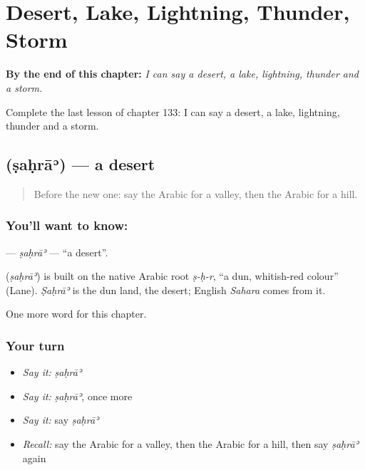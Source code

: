 
\chapter{Desert, Lake, Lightning, Thunder, Storm}
\label{ch:ar-desert-lake-lightning-thunder-storm}

\begin{chapteropening}
\textbf{By the end of this chapter:} \emph{I can say a desert, a lake, lightning, thunder and a storm.}

Complete the last lesson of chapter 133: I can say a desert, a lake, lightning, thunder and a storm.
\end{chapteropening}

\section[\texorpdfstring{\ar{صحراء} (ṣaḥrāʾ)}{صحراء (ṣaḥrāʾ)}]{ (ṣaḥrāʾ) — a desert}

\label{lesson:AR-C133-sahra}



\begin{quote}
Before the new one: say the Arabic for a valley, then the Arabic for a hill.
\end{quote}

\subsection*{You'll want to know: }
\textbf{} — \emph{ṣaḥrāʾ} — \textquotedblleft{}a desert\textquotedblright{}.

\begin{cousinweb}
\textbf{} (\emph{ṣaḥrāʾ}) is built on the native Arabic root \emph{ṣ-ḥ-r}, \textquotedblleft{}a dun, whitish-red colour\textquotedblright{} (Lane). \emph{Ṣaḥrāʾ} is the dun land, the desert; English \emph{Sahara} comes from it.
\end{cousinweb}

\begin{grammarlens}[title={What you've built}]
One more word for this chapter.
\end{grammarlens}

\subsection*{Your turn}
\begin{itemize}
\raggedright
  \item \emph{Say it:} \emph{ṣaḥrāʾ}
  \item \emph{Say it:} \emph{ṣaḥrāʾ}, once more
  \item \emph{Say it:} say \emph{ṣaḥrāʾ}
  \item \emph{Recall:} say the Arabic for a valley, then the Arabic for a hill, then say \emph{ṣaḥrāʾ} again
\end{itemize}

